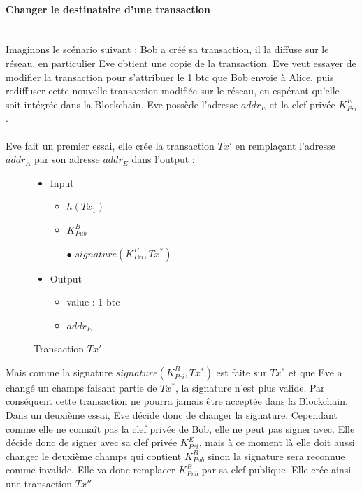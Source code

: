 \documentclass[11pt,a4paper]{article}
\begin{document}
\paragraph{Changer le destinataire d'une transaction\\\\}

Imaginons le scénario suivant : Bob a créé sa transaction, il la diffuse sur le réseau, en particulier Eve obtient une copie de la transaction. Eve veut essayer de modifier la transaction pour s'attribuer le 1 btc que Bob envoie à Alice, puis rediffuser cette nouvelle transaction modifiée sur le réseau, en espérant qu'elle soit intégrée dans la Blockchain. Eve possède l'adresse $addr_E$ et la clef privée 
$K^E_{Pri}$.\\\\
Eve fait un premier essai, elle crée la transaction $Tx'$ en remplaçant l'adresse $addr_A$ par son adresse $addr_E$ dans l'output :

\begin{figure}[H]
\begin{itemize}
\renewcommand{\labelitemi}{$\bullet$}
\renewcommand{\labelitemii}{$\star$}

\item Input
\begin{itemize}
\item $h(Tx_1)$
\item $K_{Pub}^{B}$
\item[$\bullet$] $signature(K_{Pri}^{B}, Tx^*)$
\end{itemize}

\item Output
\begin{itemize}
\item value : 1 btc
\item $addr_E$
\end{itemize}

\end{itemize}

\caption{Transaction $Tx'$}
\end{figure}

Mais comme la signature $signature(K_{Pri}^{B}, Tx^*)$ est faite sur $Tx^*$ et que Eve a changé un champs faisant partie de $Tx^*$, la signature n'est plus valide. Par conséquent cette transaction ne pourra jamais être acceptée dans la Blockchain. Dans un deuxième essai, Eve décide donc de changer la signature. Cependant comme elle ne connaît pas la clef privée de Bob, elle ne peut pas signer avec. Elle décide donc de signer avec sa clef privée $K^E_{Pri}$, mais à ce moment là elle doit aussi changer le deuxième champs qui contient $K^B_{Pub}$ sinon la signature sera reconnue comme invalide. Elle va donc remplacer $K^B_{Pub}$ par sa clef publique. Elle crée ainsi une transaction $Tx''$
\end{document}
